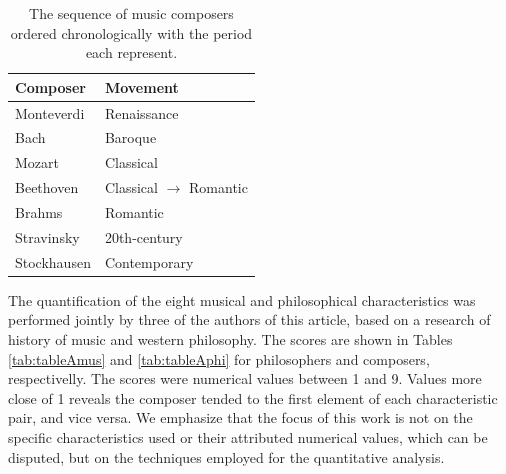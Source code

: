 \documentclass[
 aip,
 jmp,
 amsmath,amssymb,
 reprint,
]{revtex4-1}
\begin{document}
\begin{table}[ht]
\caption{\label{tab:table0} The sequence of music composers ordered chronologically
with the period each represent.}
\begin{tabular}{|l||l|}
\hline
 Composer       &  Movement \\ \hline
 Monteverdi      & Renaissance \\
 Bach            & Baroque \\
 Mozart          & Classical \\
 Beethoven       & Classical $\to$ Romantic \\
 Brahms          & Romantic \\
 Stravinsky      & 20th-century \\
 Stockhausen     & Contemporary\\
\hline
\end{tabular}
\end{table}

The quantification of the eight musical and philosophical
characteristics was performed jointly by three of the authors of this
article, based on a research of history of music and western philosophy. The scores are shown in Tables \ref{tab:tableAmus} and \ref{tab:tableAphi} for philosophers and composers, respectivelly. The scores were
numerical values between 1 and 9. Values more close of 1 reveals the
composer tended to the first element of each characteristic pair, and
vice versa. We emphasize that the focus of this work is not on the specific 
characteristics used or their attributed numerical values,
which can be disputed, but on the techniques employed for the quantitative analysis.
\end{document}
